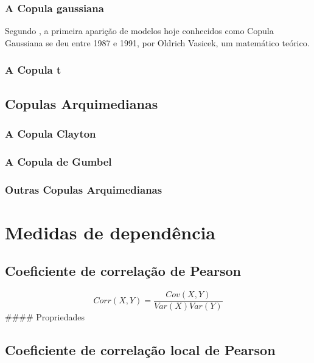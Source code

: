 \documentclass[
	12pt,				%
	oneside,			%
	a4paper,			%
	chapter=TITLE,		%
	section=TITLE,		%
	english,			%
	brazil				%
	]{abntex2}
\begin{document}
\subsubsection{A Copula gaussiana}\label{a-copula-gaussiana}

Segundo \textcite{formula}, a primeira aparição de modelos hoje
conhecidos como Copula Gaussiana se deu entre 1987 e 1991, por Oldrich
Vasicek, um matemático teórico.

\subsubsection{A Copula t}\label{a-copula-t}

\subsection{Copulas Arquimedianas}\label{copulas-arquimedianas}

\subsubsection{A Copula Clayton}\label{a-copula-clayton}

\subsubsection{A Copula de Gumbel}\label{a-copula-de-gumbel}

\subsubsection{Outras Copulas
Arquimedianas}\label{outras-copulas-arquimedianas}

\section{Medidas de dependência}\label{medidas-de-dependuxeancia}

\subsection{Coeficiente de correlação de
Pearson}\label{coeficiente-de-correlauxe7uxe3o-de-pearson}

\[Corr(X, Y ) = \frac{Cov(X, Y )}{Var(X)Var(Y)}\] \#\#\#\# Propriedades

\subsection{Coeficiente de correlação local de
Pearson}\label{coeficiente-de-correlauxe7uxe3o-local-de-pearson}
\end{document}
